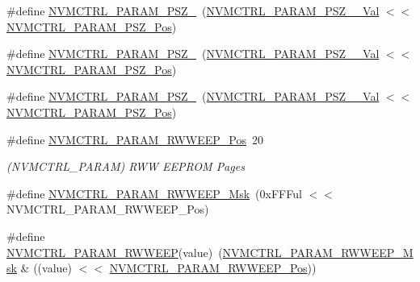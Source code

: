 \begin{DoxyCompactItemize}
\item 
\#define \mbox{\hyperlink{group___s_a_m_d21___n_v_m_c_t_r_l_ga4ed90755a60fe915da872cb1151170a9}{N\+V\+M\+C\+T\+R\+L\+\_\+\+P\+A\+R\+A\+M\+\_\+\+P\+S\+Z\+\_}}~(\mbox{\hyperlink{group___s_a_m_d21___n_v_m_c_t_r_l_ga7f53d9c6161bf83ef35275e90438e9e2}{N\+V\+M\+C\+T\+R\+L\+\_\+\+P\+A\+R\+A\+M\+\_\+\+P\+S\+Z\+\_\+\_\+\+Val}}     $<$$<$ \mbox{\hyperlink{group___s_a_m_d21___n_v_m_c_t_r_l_gabec5624158a60a0f0d0b8a62afe18af8}{N\+V\+M\+C\+T\+R\+L\+\_\+\+P\+A\+R\+A\+M\+\_\+\+P\+S\+Z\+\_\+\+Pos}})
\item 
\#define \mbox{\hyperlink{group___s_a_m_d21___n_v_m_c_t_r_l_ga0c5eba0af849936464336787aaa30734}{N\+V\+M\+C\+T\+R\+L\+\_\+\+P\+A\+R\+A\+M\+\_\+\+P\+S\+Z\+\_}}~(\mbox{\hyperlink{group___s_a_m_d21___n_v_m_c_t_r_l_gac19388a03c011b81e82b35dfd7da69b1}{N\+V\+M\+C\+T\+R\+L\+\_\+\+P\+A\+R\+A\+M\+\_\+\+P\+S\+Z\+\_\+\_\+\+Val}}     $<$$<$ \mbox{\hyperlink{group___s_a_m_d21___n_v_m_c_t_r_l_gabec5624158a60a0f0d0b8a62afe18af8}{N\+V\+M\+C\+T\+R\+L\+\_\+\+P\+A\+R\+A\+M\+\_\+\+P\+S\+Z\+\_\+\+Pos}})
\item 
\#define \mbox{\hyperlink{group___s_a_m_d21___n_v_m_c_t_r_l_ga3dc7aa1196aff3381eefe55a8789ca5d}{N\+V\+M\+C\+T\+R\+L\+\_\+\+P\+A\+R\+A\+M\+\_\+\+P\+S\+Z\+\_}}~(\mbox{\hyperlink{group___s_a_m_d21___n_v_m_c_t_r_l_ga7bffb82ccc9a71552882baabdfa97b13}{N\+V\+M\+C\+T\+R\+L\+\_\+\+P\+A\+R\+A\+M\+\_\+\+P\+S\+Z\+\_\+\_\+\+Val}}    $<$$<$ \mbox{\hyperlink{group___s_a_m_d21___n_v_m_c_t_r_l_gabec5624158a60a0f0d0b8a62afe18af8}{N\+V\+M\+C\+T\+R\+L\+\_\+\+P\+A\+R\+A\+M\+\_\+\+P\+S\+Z\+\_\+\+Pos}})
\item 
\#define \mbox{\hyperlink{group___s_a_m_d21___n_v_m_c_t_r_l_gadbe4b71fb59b5853ceb8536c6292b4cc}{N\+V\+M\+C\+T\+R\+L\+\_\+\+P\+A\+R\+A\+M\+\_\+\+R\+W\+W\+E\+E\+P\+\_\+\+Pos}}~20
\begin{DoxyCompactList}\small\item\em (N\+V\+M\+C\+T\+R\+L\+\_\+\+P\+A\+R\+AM) R\+WW E\+E\+P\+R\+OM Pages \end{DoxyCompactList}\item 
\#define \mbox{\hyperlink{group___s_a_m_d21___n_v_m_c_t_r_l_gab2b3b61e1f28ca33f16a0328fac7d9c2}{N\+V\+M\+C\+T\+R\+L\+\_\+\+P\+A\+R\+A\+M\+\_\+\+R\+W\+W\+E\+E\+P\+\_\+\+Msk}}~(0x\+F\+F\+Ful $<$$<$ N\+V\+M\+C\+T\+R\+L\+\_\+\+P\+A\+R\+A\+M\+\_\+\+R\+W\+W\+E\+E\+P\+\_\+\+Pos)
\item 
\#define \mbox{\hyperlink{group___s_a_m_d21___n_v_m_c_t_r_l_ga4a74ee4bb2487c1d99869bf24e611ed5}{N\+V\+M\+C\+T\+R\+L\+\_\+\+P\+A\+R\+A\+M\+\_\+\+R\+W\+W\+E\+EP}}(value)~(\mbox{\hyperlink{group___s_a_m_d21___n_v_m_c_t_r_l_gab2b3b61e1f28ca33f16a0328fac7d9c2}{N\+V\+M\+C\+T\+R\+L\+\_\+\+P\+A\+R\+A\+M\+\_\+\+R\+W\+W\+E\+E\+P\+\_\+\+Msk}} \& ((value) $<$$<$ \mbox{\hyperlink{group___s_a_m_d21___n_v_m_c_t_r_l_gadbe4b71fb59b5853ceb8536c6292b4cc}{N\+V\+M\+C\+T\+R\+L\+\_\+\+P\+A\+R\+A\+M\+\_\+\+R\+W\+W\+E\+E\+P\+\_\+\+Pos}}))
$$
\end{DoxyCompactItemize}
